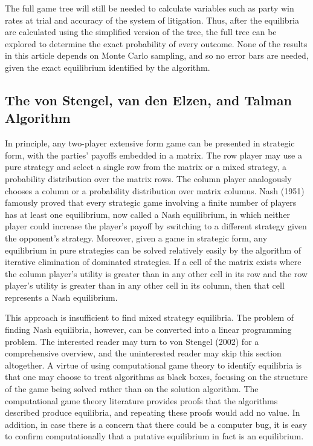 \documentclass{article}
\begin{document}
The full game tree will still be needed to calculate variables such as party win rates at trial and accuracy of the system of litigation. Thus, after the equilibria are calculated using the simplified version of the tree, the full tree can be explored to determine the exact probability of every outcome. None of the results in this article depends on Monte Carlo sampling, and so no error bars are needed, given the exact equilibrium identified by the algorithm.

\subsection{The von Stengel, van den Elzen, and Talman Algorithm}

In principle, any two-player extensive form game can be presented in strategic form, with the parties' payoffs embedded in a matrix. The row player may use a pure strategy and select a single row from the matrix or a mixed strategy, a probability distribution over the matrix rows. The column player analogously chooses a column or a probability distribution over matrix columns. Nash (1951) famously proved that every strategic game involving a finite number of players has at least one equilibrium, now called a Nash equilibrium, in which neither player could increase the player's payoff by switching to a different strategy given the opponent's strategy. Moreover, given a game in strategic form, any equilibrium in pure strategies can be solved relatively easily by the algorithm of iterative elimination of dominated strategies. If a cell of the matrix exists where the column player's utility is greater than in any other cell in its row and the row player's utility is greater than in any other cell in its column, then that cell represents a Nash equilibrium. 

This approach is insufficient to find mixed strategy equilibria. The problem of finding Nash equilibria, however, can be converted into a linear programming problem. The interested reader may turn to von Stengel (2002) for a comprehensive overview, and the uninterested reader may skip this section altogether. A virtue of using computational game theory to identify equilibria is that one may choose to treat algorithms as black boxes, focusing on the structure of the game being solved rather than on the solution algorithm. The computational game theory literature provides proofs that the algorithms described produce equilibria, and repeating these proofs would add no value. In addition, in case there is a concern that there could be a computer bug, it is easy to confirm computationally that a putative equilibrium in fact is an equilibrium.
\end{document}
